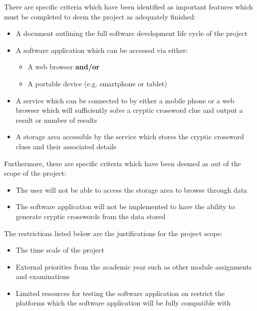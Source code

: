 There are specific criteria which have been identified as important features
which must be completed to deem the project as adequately finished:

\begin{itemize}
  \item A document outlining the full software development life cycle of the 
        project
  \item A software application which can be accessed via either:
    \begin{itemize}
      \item A web browser \textbf{and/or}
      \item A portable device (e.g. smartphone or tablet)
    \end{itemize}
  \item A service which can be connected to by either a mobile phone or a web 
        browser which will sufficiently solve a cryptic crossword clue and 
        output a result or number of results 
  \item A storage area accessible by the service which stores the cryptic 
        crossword clues and their associated details
\end{itemize}

Furthermore, there are specific criteria which have been deemed as out of the 
scope of the project:

\begin{itemize}
  \item The user will not be able to access the storage area to browse through 
        data
  \item The software application will not be implemented to have the ability to
        generate cryptic crosswords from the data stored
\end{itemize}

The restrictions listed below are the justifications for the project scope:

\begin{itemize}
  \item The time scale of the project
  \item External priorities from the academic year such as other module 
        assignments and examinations
  \item Limited resources for testing the software application on restrict the
        platforms which the software application will be fully compatible with
\end{itemize}
